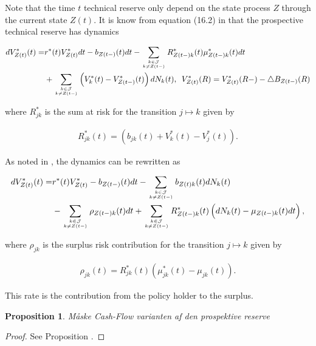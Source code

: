\documentclass{article}
\newcommand{\1}[1]{\mathbbm{1}_{\left\lbrace #1 \right\rbrace}}
\theoremstyle{break}
\newtheorem{proposition}[definition]{Proposition}%
\theoremstyle{remark}
\numberwithin{equation}{section}
\begin{document}
Note that the time $t$ technical reserve only depend on the state process $Z$ through the current state $Z(t)$. It is know from equation (16.2) in \cite{LivStok} that the prospective technical reserve has dynamics

\begin{align*}
	dV_{Z(t)}^*(t) =& r^*(t) V_{Z(t)}^* dt - b_{Z(t-)}(t) dt - \sum_{k \in \mathcal{J} \atop k \neq Z(t-)} R_{Z(t-)k}^*(t) \mu_{Z(t-)k}^*(t) dt \\
	&+ \sum_{k \in \mathcal{J} \atop k \neq Z(t-)} \left( V_k^*(t) - V_{Z(t-)}^*(t) \right) dN_k(t), \, \, \, V_{Z(t)}^*(R) =  V_{Z(t)}^*(R-) - \triangle B_{Z(t-)}(R)
\end{align*}

where $R_{jk}^*$ is the sum at risk for the transition $j \mapsto k$ given by

\begin{align*}
	R_{jk}^*(t) = \left( b_{jk}(t) + V_{k}^*(t) - V_{j}^*(t) \right).
\end{align*}

As noted in \cite{Lollike}, the dynamics can be rewritten as

\begin{align} \label{ReserveDynamics}
\begin{split}
	dV_{Z(t)}^*(t) =& r^*(t) V_{Z(t)}^* - b_{Z(t-)}(t) dt - \sum_{k \in \mathcal{J} \atop k \neq Z(t-)} b_{Z(t)k}(t) dN_k(t) \\
	&- \sum_{k \in \mathcal{J} \atop k \neq Z(t-)} \rho_{Z(t-)k}(t) dt + \sum_{k \in \mathcal{J} \atop k \neq Z(t-)} R_{Z(t-)k}^*(t) \left( dN_k(t) - \mu_{Z(t-)k}(t) dt \right),
\end{split}
\end{align}

where $\rho_{jk}$ is the surplus risk contribution for the transition $j \mapsto k$ given by

\begin{align*}
	\rho_{jk}(t) = R_{jk}^*(t) \left( \mu_{jk}^*(t) - \mu_{jk}(t) \right).
\end{align*}

This rate is the contribution from the policy holder to the surplus.

\begin{proposition}
	Måske Cash-Flow varianten af den prospektive reserve
\end{proposition}

\begin{proof}
	See Proposition \cite{BuchardtMoller}.
\end{proof}
\end{document}
